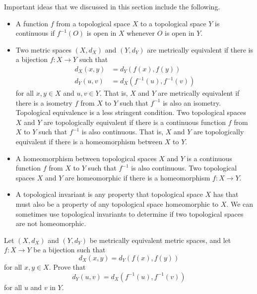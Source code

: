 \label{sec_cont_top_summ}
Important ideas that we discussed in this section include the following.
\begin{itemize}
\item A function $f$ from a topological space $X$ to a topological space $Y$ is continuous if $f^{-1}(O)$ is open in $X$ whenever $O$ is open in $Y$. 
\item Two metric spaces $(X,d_X)$ and $(Y,d_Y)$ are metrically equivalent if there is a bijection $f : X \to Y$ such that 
\begin{align*}
d_X(x,y) &= d_Y(f(x),f(y)) \\
d_Y(u,v) &= d_X(f^{-1}(u), f^{-1}(v))
\end{align*}
for all $x,y \in X$ and $u,v \in Y$. That is, $X$ and $Y$ are metrically equivalent if there is a isometry $f$ from $X$ to $Y$ such that $f^{-1}$ is also an isometry. Topological equivalence is a less stringent condition. Two topological spaces $X$ and $Y$ are topologically equivalent if there is a continuous function $f$ from $X$ to $Y$ such that $f^{-1}$ is also continuous. That is, $X$ and $Y$ are topologically equivalent if there is a homeomorphism between $X$ to $Y$. 
\item A homeomorphism between topological spaces $X$ and $Y$ is a continuous function $f$ from $X$ to $Y$ such that $f^{-1}$ is also continuous. Two topological spaces $X$ and $Y$ are homeomorphic if there is a homeomorphism $f : X \to Y$. 
\item A topological invariant is any property that topological space $X$ has that must also be a property of any topological space homeomorphic to $X$. We can sometimes use topological invariants to determine if two topological spaces are not homeomorphic.
\end{itemize}

\label{sec_cont_top_exer}

\be

\item \label{ex:isometry_reverse} Let $(X,d_X)$ and $(Y,d_Y)$ be metrically equivalent metric spaces, and let $f:X \to Y$ be a bijection such that 
\[d_X(x,y) = d_Y(f(x),f(y))\]
for all $x,y \in X$. Prove that 
\[d_Y(u,v) = d_X(f^{-1}(u), f^{-1}(v))\]
for all $u$ and $v$ in $Y$. 

\begin{comment}

\ExerciseSolution Let $u,v$ be elements in $Y$. Since $f$ is a bijection, there exist $x$ and $y$ in $X$ such that $f(x) = u$ and $f(y) = b$, or $u = f^{-1}(x)$ and $b = f^{-1}(y)$. Then
\[d_Y(u,v) = d_Y(f(x),f(y)) = d_X(x,y) = d_X(f^{-1}(u), f^{-1}(v)).\]

\end{comment}

